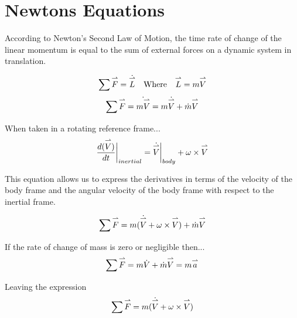 \newpage 

\section{Newtons Equations}

According to Newton's Second Law of Motion, the time rate of change of the linear momentum is equal to the sum of external forces on a dynamic system in translation. 

$$\sum \overset{\rightharpoonup}{F} = \dot{\overset{\rightharpoonup}{L}} \quad \text{Where} \quad \overset{\rightharpoonup}{L} = m\overset{\rightharpoonup}{V}$$ 
$$\sum\overset{\rightharpoonup}{F} = \dot{m\overset{\rightharpoonup}{V}} = m\dot{\overset{\rightharpoonup}{V}} + \dot{m}\overset{\rightharpoonup}{V}$$

When taken in a rotating reference frame... 
$$\frac{d(\overset{\rightharpoonup}{V})}{dt} \biggr \rvert_{inertial} = \dot{\overset{\rightharpoonup}{V}} \biggr \rvert_{body} + \omega \times \overset{\rightharpoonup}{V}$$

This equation allows us to express the derivatives in terms of the velocity of the body frame and the angular velocity of the body frame with respect to the inertial frame.

$$\sum\overset{\rightharpoonup}{F} = m(\dot{\overset{\rightharpoonup}{V}} + \omega \times \overset{\rightharpoonup}{V}) + \dot{m}\overset{\rightharpoonup}{V}$$

If the rate of change of mass is zero or negligible then... 
$$\sum\overset{\rightharpoonup}{F} = m\dot{V} + \dot{m}\overset{\rightharpoonup}{V} = m \overset{\rightharpoonup}{a}$$

Leaving the expression 
$$\sum\overset{\rightharpoonup}{F} =  m(\dot{\overset{\rightharpoonup}{V}} + \omega \times \overset{\rightharpoonup}{V})$$


